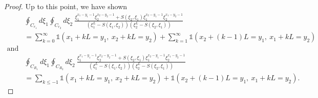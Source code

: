 \documentclass[10pt,a4paper]{amsart}
\begin{document}
\begin{proof}
Up to this point, we have shown 
\begin{equation}
    \begin{split}
        &\oint_{C_{r_1}}d\xi_1\oint_{C_{r_2}}d\xi_2 \ \frac{\xi_1^{x_1-y_1-1}\xi_2^{x_2-y_2-1}+ S(\xi_2,\xi_1)\xi_1^{x_2-y_1-1}\xi_2^{x_1-y_2-1}}{\left( \xi_1^L-S(\xi_1,\xi_2) \right)\left( \xi_2^L-S(\xi_2,\xi_1) \right)} \\
        &= \sum_{k=0}^\infty \mathds{1}\left( x_1+kL=y_1,  \ x_2+kL=y_2 \right) + \sum_{k=1}^\infty\mathds{1}\left( x_2+(k-1)L=y_1,  \ x_1+kL=y_2 \right) \\ \text{and}\\
        &\oint_{C_{R_1}}d\xi_1\oint_{C_{R_2}}d\xi_2 \ \frac{\xi_1^{x_1-y_1-1}\xi_2^{x_2-y_2-1}+ S(\xi_2,\xi_1)\xi_1^{x_2-y_1-1}\xi_2^{x_1-y_2-1}}{\left( \xi_1^L-S(\xi_1,\xi_2) \right)\left( \xi_2^L-S(\xi_2,\xi_1) \right)}\\
        &= \sum_{k\leq -1} \mathds{1}\left( x_1+kL=y_1,  \ x_2+kL=y_2 \right) + \mathds{1}\left( x_2+(k-1)L=y_1,  \ x_1+kL=y_2 \right).
    \end{split}
\end{equation}


\end{proof}
\end{document}
